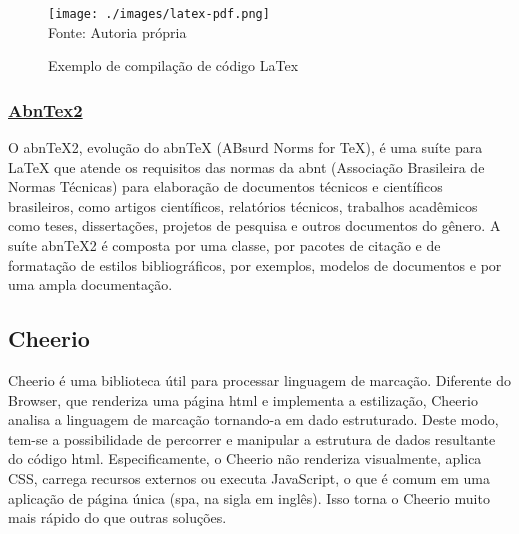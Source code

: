 \begin{figure}[H]
    \centering
    \caption{Exemplo de compilação de código LaTex}
    \texttt{[image: ./images/latex-pdf.png]}
    \label{fig:latex-pdf} \\
    \textnormal{\fontsize{10pt}{12pt}Fonte: Autoria própria}
\end{figure}

\subsubsection{\underline{AbnTex2}}

\vspace{15mm}
    \noindent
    \begin{minipage}{\textwidth}
        \noindent
        \begin{minipage}{4cm}
        \end{minipage}%
        \hfill
        \begin{minipage}{\dimexpr\textwidth-4cm}
            \hspace*{\parindent}
            \fontsize{10pt}{12pt}\selectfont %
            O abnTeX2, evolução do abnTeX (ABsurd Norms for TeX), é uma suíte para LaTeX que atende os requisitos das normas da
\acrshort{abnt}
(Associação Brasileira de Normas Técnicas) para elaboração de documentos técnicos e científicos brasileiros, como artigos científicos, relatórios técnicos, trabalhos acadêmicos como teses, dissertações, projetos de pesquisa e outros documentos do gênero.
 A suíte abnTeX2 é composta por uma classe, por pacotes de citação e de formatação de estilos bibliográficos, por exemplos, modelos de documentos e por uma ampla documentação.
 \cite{abntex2}
        \end{minipage}
    \end{minipage}
    \vspace{15mm}

\subsection{Cheerio}

Cheerio é uma biblioteca útil para processar linguagem de marcação.
Diferente do Browser, que renderiza uma página
\acrshort{html}
e implementa a estilização, Cheerio analisa a linguagem de marcação
tornando-a em dado estruturado. Deste modo, tem-se a possibilidade
de percorrer e manipular a estrutura de dados resultante do
código
\acrshort{html}.
Especificamente, o Cheerio não renderiza visualmente, aplica CSS,
carrega recursos externos ou executa JavaScript, o que é comum
em uma aplicação de página única
(\acrshort{spa},
na sigla em inglês).
Isso torna o Cheerio muito mais rápido do que outras soluções.

